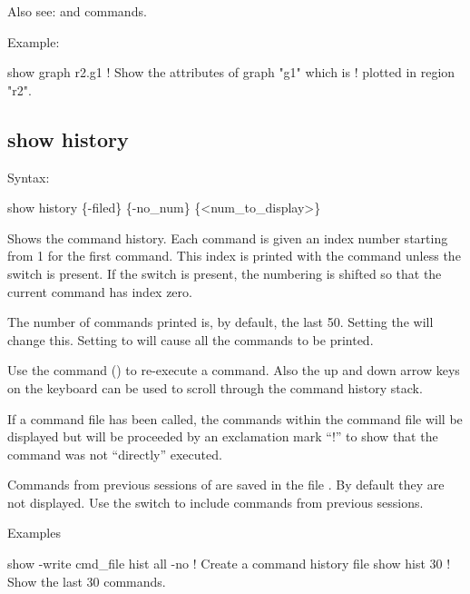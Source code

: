{{{{{{{{{Also see:  and  commands.

Example:
\begin{example}
  show graph r2.g1         ! Show the attributes of graph "g1" which is 
                           !   plotted in region "r2".
\end{example}


\subsection{show history}
\label{s:show.history}

Syntax:
\begin{example}
  show history \{-filed\} \{-no_num\} \{<num_to_display>\}
\end{example}

Shows the command history. Each command is given an index number starting from 1 for the first
command. This index is printed with the command unless the  switch is present. If the
 switch is present, the numbering is shifted so that the current  command
has index zero.

The number of commands printed is, by default, the last 50. Setting the  will
change this. Setting  to   will cause all the commands to be printed.

Use the command  () to re-execute a command. Also the up and down
arrow keys on the keyboard can be used to scroll through the command history stack.

If a command file has been called, the commands within the command file will be displayed but will
be proceeded by an exclamation mark ``!'' to show that the command was not ``directly'' executed.

Commands from previous sessions of \tao are saved in the file . By default they
are not displayed. Use the  switch to include commands from previous sessions.

Examples
\begin{example}
  show -write cmd_file hist all -no   ! Create a command history file
  show hist 30                        ! Show the last 30 commands.
\end{example}


}}}}}}}}}
